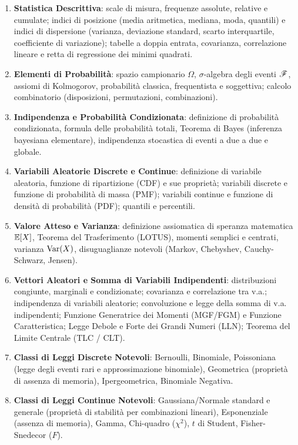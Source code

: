 \documentclass[11pt,a4paper,twoside,openright]{book}
\begin{document}
\begin{enumerate}
    \item \textbf{Statistica Descrittiva}: scale di misura, frequenze assolute, relative e cumulate; indici di posizione (media aritmetica, mediana, moda, quantili) e indici di dispersione (varianza, deviazione standard, scarto interquartile, coefficiente di variazione); tabelle a doppia entrata, covarianza, correlazione lineare e retta di regressione dei minimi quadrati.
    \item \textbf{Elementi di Probabilità}: spazio campionario $\Omega$, $\sigma$-algebra degli eventi $\mathscr{F}$, assiomi di Kolmogorov, probabilità classica, frequentista e soggettiva; calcolo combinatorio (disposizioni, permutazioni, combinazioni).
    \item \textbf{Indipendenza e Probabilità Condizionata}: definizione di probabilità condizionata, formula delle probabilità totali, Teorema di Bayes (inferenza bayesiana elementare), indipendenza stocastica di eventi a due a due e globale.
    \item \textbf{Variabili Aleatorie Discrete e Continue}: definizione di variabile aleatoria, funzione di ripartizione (CDF) e sue proprietà; variabili discrete e funzione di probabilità di massa (PMF); variabili continue e funzione di densità di probabilità (PDF); quantili e percentili.
    \item \textbf{Valore Atteso e Varianza}: definizione assiomatica di speranza matematica $\mathbb{E}[X]$, Teorema del Trasferimento (LOTUS), momenti semplici e centrati, varianza $\operatorname{Var}(X)$, disuguaglianze notevoli (Markov, Chebyshev, Cauchy-Schwarz, Jensen).
    \item \textbf{Vettori Aleatori e Somma di Variabili Indipendenti}: distribuzioni congiunte, marginali e condizionate; covarianza e correlazione tra v.a.; indipendenza di variabili aleatorie; convoluzione e legge della somma di v.a. indipendenti; Funzione Generatrice dei Momenti (MGF/FGM) e Funzione Caratteristica; Legge Debole e Forte dei Grandi Numeri (LLN); Teorema del Limite Centrale (TLC / CLT).
    \item \textbf{Classi di Leggi Discrete Notevoli}: Bernoulli, Binomiale, Poissoniana (legge degli eventi rari e approssimazione binomiale), Geometrica (proprietà di assenza di memoria), Ipergeometrica, Binomiale Negativa.
    \item \textbf{Classi di Leggi Continue Notevoli}: Gaussiana/Normale standard e generale (proprietà di stabilità per combinazioni lineari), Esponenziale (assenza di memoria), Gamma, Chi-quadro ($\chi^2$), $t$ di Student, Fisher-Snedecor ($F$).

\end{enumerate}
\end{document}
